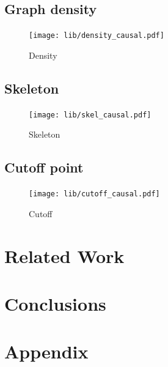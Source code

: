 \documentclass[11pt,a4paper]{report}
\begin{document}
\section{Graph density}
\begin{figure}[h]
  \centering
  \texttt{[image: lib/density\_causal.pdf]}
  \caption{Density}
  \label{density_causal}
\end{figure}

\section{Skeleton}
\begin{figure}
  \centering
  \texttt{[image: lib/skel\_causal.pdf]}
  \caption{Skeleton}
  \label{skel_causal}
\end{figure}

\section{Cutoff point}
\begin{figure}
  \centering
  \texttt{[image: lib/cutoff\_causal.pdf]}
  \caption{Cutoff}
  \label{cutoff_causal}
\end{figure}

\chapter{Related Work}\label{relatedwork}

\chapter{Conclusions}\label{conclusions}

\printbibliography

\appendix

\chapter{Appendix}\label{appendix}
\end{document}

